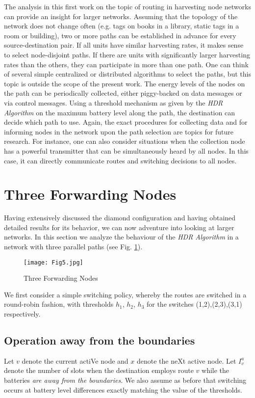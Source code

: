\documentclass[12 pt]{article}
\newcommand{\debug}[1]{\mbox{\tt #1}}
\renewcommand{\debug}[1]{}              \newcommand{\cmd}[1]{}
\newcommand{\2}{\>\>}
\newcommand{\3}{\>\>\>}
\newcommand{\4}{\>\>\>\>}
\newcommand{\5}{\>\>\>\>\>}
\newcommand{\6}{\>\>\>\>\>\>}
\newcommand{\7}{\6\>}
\newcommand{\8}{\6\2}
\newcommand{\sname}{}
\newcommand{\dref}[1]{\ref{#1}\debug{[#1]}\cmd{dref}}
\newcommand{\dlabelx}[1]{\debug{\fbox{\tiny #1}}\label{#1}}
\newcommand{\msec}[2]{\renewcommand{\sname}{}\section[#1
	\debug{\fbox {#2}}]{#1 \cmd{msec} \dlabelx{#2}}\markboth{\today}{Sec. \thesection}}
\newcommand{\msubsection}[2]{\subsection[#1 \debug{\fbox {#2}}]
	{#1 \cmd{msubsection} \dlabelx{#2}}\markboth{\today}{Sec. \thesection}}
\begin{document}
The analysis in this first work on the topic of routing in harvesting node networks can provide an insight for larger networks.  Assuming that the topology of the network does not change often (e.g. tags on books in a library, static tags in a room or building), two or more paths can be established in advance for every source-destination pair.  If all units have similar harvesting rates, it makes sense to select node-disjoint paths.  If there are units with significantly larger harvesting rates than the others, they can participate in more than one path.  One can think of several simple centralized or distributed algorithms to select the paths, but this topic is outside the scope of the present work.  The energy levels of the nodes on the path can be periodically collected, either piggy-backed on data messages or via control messages.   Using a threshold mechanism as given by the \emph{HDR Algorithm} on the maximum battery level along the path, the destination can decide which path to use.  Again, the exact procedures for collecting data and for informing nodes in the network upon the path selection are topics for future research.  For instance, one can also consider situations when the collection node has a powerful transmitter that can be simultaneously heard by all nodes.  In this case, it can directly communicate routes and switching decisions to all nodes.

\msec{Three Forwarding Nodes}{three}

Having extensively discussed the diamond configuration and having obtained detailed results for its behavior, we can now adventure into looking at larger networks.
In this section we analyze the behaviour of the \emph{HDR Algorithm} in a network with three parallel paths (see Fig. \dref{fig-3nodes}).

\begin{figure}[hbtp]
\begin{center}
\texttt{[image: Fig5.jpg]}
\caption{Three Forwarding Nodes\debug{\fbox{fig-3nodes}}\label{fig-3nodes}}
\end{center}
\end{figure}

We first consider a simple switching policy, whereby the routes are switched in a round-robin fashion, with thresholds $h_1$, $h_2$, $h_3$ for the switches (1,2),(2,3),(3,1) respectively.

\msubsection{Operation away from the boundaries}{away3}

Let $v$ denote the current actiVe node and $x$ denote the neXt active node.  Let $I_v^a$ denote the number of slots when the destination employs route $v$ while the batteries \emph{are away from the boundaries}.  We also assume as before that switching occurs at battery level differences exactly matching the value of the thresholds.
\end{document}
